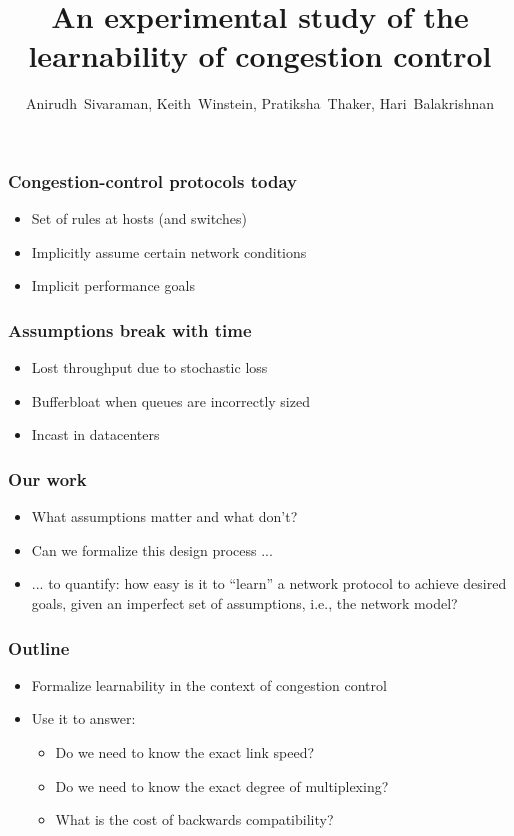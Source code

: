 \documentclass[svgnames]{beamer}
\title{An experimental study of the learnability of congestion control}
\author{Anirudh~Sivaraman, Keith~Winstein, Pratiksha~Thaker, Hari~Balakrishnan}
\institute{MIT CSAIL\vspace{\baselineskip}}
\begin{document}
\begin{frame}

\titlepage

\end{frame}

\begin{Large}
\begin{frame}
\frametitle{Congestion-control protocols today}
\begin{itemize}
\item<2-> Set of rules at hosts (and switches)
\item<3-> Implicitly assume certain network conditions
\item<4-> Implicit performance goals
\end{itemize}
\end{frame}

\begin{frame}
\frametitle{Assumptions break with time}
\begin{itemize}
\item Lost throughput due to stochastic loss 
\item Bufferbloat when queues are incorrectly sized
\item Incast in datacenters
\end{itemize}
\end{frame}

\begin{frame}
\frametitle{Our work}
\begin{itemize}
\item<1-> What assumptions matter and what don't?
\item<2-> Can we formalize this design process ...
\item<3-> ... to quantify: how easy is it to “learn” a network protocol to achieve desired goals, given
an imperfect set of assumptions, i.e., the network model?
\end{itemize}
\end{frame}

\begin{frame}
\frametitle{Outline}
\begin{itemize}
\item Formalize learnability in the context of congestion control
\item Use it to answer:
\begin{itemize}
\item Do we need to know the exact link speed?
\item Do we need to know the exact degree of multiplexing?
\item What is the cost of backwards compatibility?
\end{itemize}
\end{itemize}
\end{frame}


\end{Large}
\end{document}
